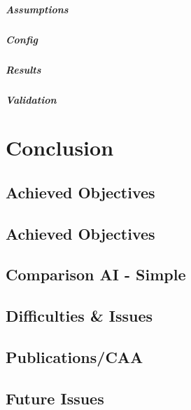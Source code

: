 \documentclass{report}
\begin{document}
\begin{enumeration}
\begin{end}
			\paragraph{Assumptions}
			\paragraph{Config}
			\paragraph{Results}
			\paragraph{Validation}


\newpage 
\chapter{Conclusion}
      \section{Achieved Objectives}
      \section{Achieved Objectives}
      \section{Comparison AI - Simple}
      \section{Difficulties \& Issues}
      \section{Publications/CAA}
      \section{Future Issues}
\newpage 


\end{end}
\end{enumeration}
\end{document}
